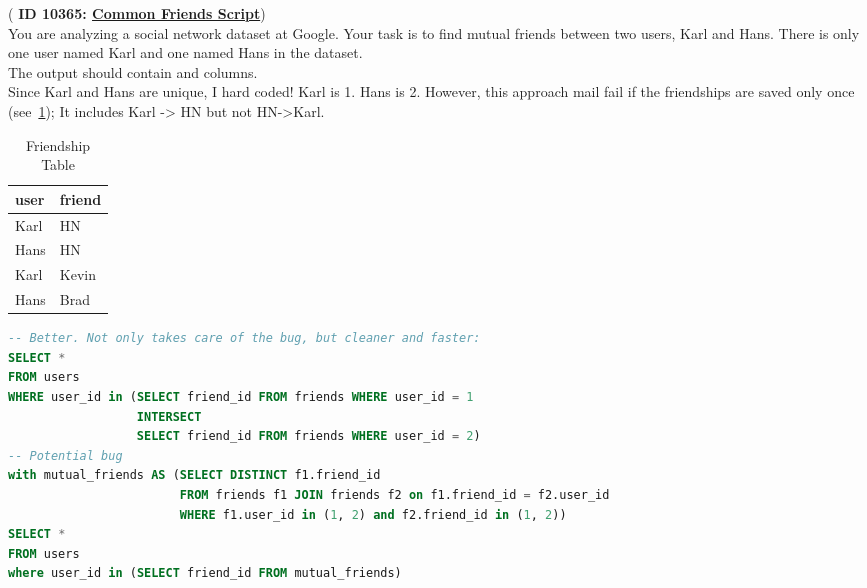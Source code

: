 \begin{exm} ({\bf  \color{orange} ID 10365: \href{https://platform.stratascratch.com/coding/10365-common-friends-script?code_type=3}{Common Friends Script}})\\
You are analyzing a social network dataset at Google. 
Your task is to find mutual friends 
between two users, Karl and Hans. There is only one user 
named Karl and one named Hans in the dataset.\\

\noindent The output should contain  and  columns.\\

\noindent  Since Karl and Hans are unique, I hard coded! Karl is 1. Hans is 2.
However, this approach mail fail if the friendships are saved only once (see~\cref{tab:FriendTablesMutual});
It includes Karl -> HN but not HN->Karl.
\begin{table}[h!]
\begin{tabular}{l|l}
\hline
user   & friend \\ \hline
Karl   & HN   \\ \hline
Hans & HN \\ \hline
Karl   & Kevin   \\ \hline
Hans & Brad \\ \hline
\end{tabular}
\caption{Friendship Table}
\label{tab:FriendTablesMutual}
\end{table}

\begin{lstlisting}[language=SQL, linewidth=1.4\textwidth]
-- Better. Not only takes care of the bug, but cleaner and faster:
SELECT * 
FROM users
WHERE user_id in (SELECT friend_id FROM friends WHERE user_id = 1
                  INTERSECT
                  SELECT friend_id FROM friends WHERE user_id = 2) 
-- Potential bug
with mutual_friends AS (SELECT DISTINCT f1.friend_id
                        FROM friends f1 JOIN friends f2 on f1.friend_id = f2.user_id
                        WHERE f1.user_id in (1, 2) and f2.friend_id in (1, 2))
SELECT *
FROM users
where user_id in (SELECT friend_id FROM mutual_friends)
\end{lstlisting}
\end{exm}


